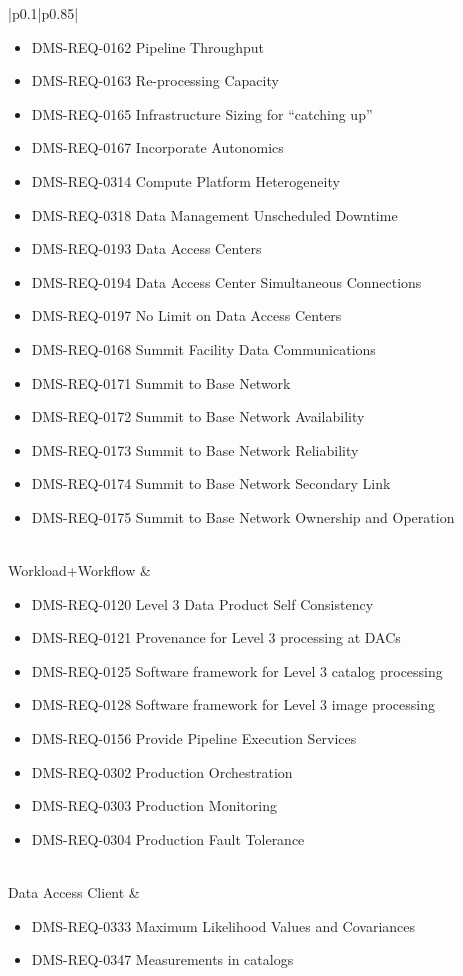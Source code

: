 \documentclass[DM,lsstdraft,toc]{lsstdoc}
\begin{document}
\begin{xtabular}{|p{0.1\textwidth}|p{0.85\textwidth}|}
\begin{itemize}
\item DMS-REQ-0162 Pipeline Throughput
\item DMS-REQ-0163 Re-processing Capacity
\item DMS-REQ-0165 Infrastructure Sizing for ``catching up''
\item DMS-REQ-0167 Incorporate Autonomics
\item DMS-REQ-0314 Compute Platform Heterogeneity
\item DMS-REQ-0318 Data Management Unscheduled Downtime
\item DMS-REQ-0193 Data Access Centers
\item DMS-REQ-0194 Data Access Center Simultaneous Connections
\item DMS-REQ-0197 No Limit on Data Access Centers
\item DMS-REQ-0168 Summit Facility Data Communications
\item DMS-REQ-0171 Summit to Base Network
\item DMS-REQ-0172 Summit to Base Network Availability
\item DMS-REQ-0173 Summit to Base Network Reliability
\item DMS-REQ-0174 Summit to Base Network Secondary Link
\item DMS-REQ-0175 Summit to Base Network Ownership and Operation \end{itemize} \\ \hline
Workload+Workflow &
\begin{itemize} \item DMS-REQ-0120 Level 3 Data Product Self Consistency
\item DMS-REQ-0121 Provenance for Level 3 processing at DACs
\item DMS-REQ-0125 Software framework for Level 3 catalog processing
\item DMS-REQ-0128 Software framework for Level 3 image processing
\item DMS-REQ-0156 Provide Pipeline Execution Services
\item DMS-REQ-0302 Production Orchestration
\item DMS-REQ-0303 Production Monitoring
\item DMS-REQ-0304 Production Fault Tolerance \end{itemize} \\ \hline
Data Access Client &
\begin{itemize} \item DMS-REQ-0333 Maximum Likelihood Values and Covariances
\item DMS-REQ-0347 Measurements in catalogs

\end{itemize}
\end{xtabular}
\end{document}
